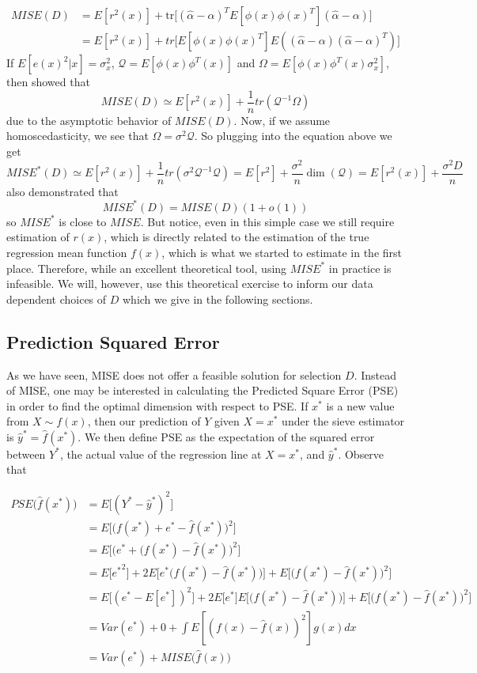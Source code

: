 \documentclass[12pt]{article}  %
\begin{document}
\begin{align*}
MISE(D) &= E[r^{2}(x)] + \text{tr}\Big[(\hat{\alpha} - \alpha)^TE[\phi(x)\phi(x)^T](\hat{\alpha} - \alpha)\Big]\\
&= E[r^{2}(x)] + tr\Big[E[\phi(x)\phi(x)^{T}]E\left((\hat{\alpha} - \alpha)(\hat{\alpha} - \alpha)^{T}\right)\Big]
\end{align*}
If $E[e(x)^2|x] = \sigma_x^2$, $\mathcal{Q} = E[\phi(x)\phi^T(x)]$ and $\Omega = E[\phi(x)\phi^T(x)\sigma_x^2]$, then \cite{Hansen} showed that 
$$MISE(D)\simeq E[r^2(x)] + \frac{1}{n}tr\left(\mathcal{Q}^{-1}\Omega\right)$$
due to the asymptotic behavior of $MISE(D)$. Now, if we assume homoscedasticity, we see that $\Omega = \sigma^2\mathcal{Q}$. So plugging into the equation above we get
$$MISE^*(D)\simeq E[r^2(x)] + \frac{1}{n}tr\left(\sigma^2\mathcal{Q}^{-1}\mathcal{Q}\right) = E[r^2] + \frac{\sigma^2}{n}\dim(\mathcal{Q}) = E[r^2(x)] + \frac{\sigma^2 D}{n}$$ \cite{Hansen} also demonstrated that $$MISE^*(D) = MISE(D)(1 + o(1))$$ so $MISE^*$ is close to $MISE$. But notice, even in this simple case we still require estimation of $r(x)$, which is directly related to the estimation of the true regression mean function $f(x)$, which is what we started to estimate in the first place. Therefore, while an excellent theoretical tool, using $MISE^*$ in practice is infeasible. We will, however, use this theoretical exercise to inform our data dependent choices of $D$ which we give in the following sections.

\subsection{Prediction Squared Error}

As we have seen, MISE does not offer a feasible solution for selection $D$. Instead of MISE, one may be interested in calculating the Predicted Square Error (PSE) in order to find the optimal dimension with respect to PSE. If $x^*$  is a new value from $X \sim f(x)$, then our prediction of $Y$ given $X = x^*$ under the sieve estimator is $\hat{y}^* = \hat{f}(x^*)$. We then define PSE as the expectation of the squared error between $Y^*$, the actual value of the regression line at $X=x^*$, and $\hat{y}^*$. Observe that

\begin{align*}
PSE\Big(\hat{f}(x^*)\Big) &= E\Big[(Y^* - \hat{y}^*)^2\Big] \\
&= E\Big[\Big(f(x^*) + e^* - \hat{f}(x^*)\Big)^2\Big] \\
&= E\Big[\Big(e^* + (f(x^*) - \hat{f}(x^*)\Big)^2\Big] \\
&= E\big[{e^*}^2\big] + 2E\Big[e^*\Big(f(x^*) - \hat{f}(x^*)\Big)\Big] + E\Big[\Big(f(x^*) - \hat{f}(x^*)\Big)^2\Big] \\
&= E\Big[{(e^* - E[e^*])}^2\Big] + 2E\big[e^*\big]E\Big[\Big(f(x^*) - \hat{f}(x^*)\Big)\Big] + E\Big[\Big(f(x^*) - \hat{f}(x^*)\Big)^2\Big] \\
&= Var(e^*) + 0 + \int E[(f(x) - \hat{f}(x))^2]g(x)dx \\
& = Var(e^*) + MISE\Big(\hat{f}(x)\Big)
\end{align*}
\end{document}
